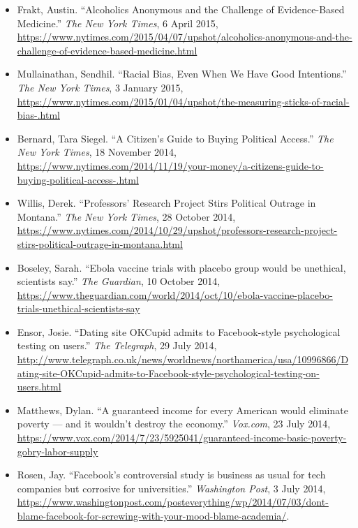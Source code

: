 \documentclass[12pt,a4paper]{article}
\begin{document}
\begin{itemize}
\item Frakt, Austin. ``Alcoholics Anonymous and the Challenge of Evidence-Based Medicine.'' \textit{The New York Times}, 6 April 2015, \url{https://www.nytimes.com/2015/04/07/upshot/alcoholics-anonymous-and-the-challenge-of-evidence-based-medicine.html}

\item Mullainathan, Sendhil. ``Racial Bias, Even When We Have Good Intentions.'' \textit{The New York Times}, 3 January 2015, \url{https://www.nytimes.com/2015/01/04/upshot/the-measuring-sticks-of-racial-bias-.html}

\item Bernard, Tara Siegel. ``A Citizen's Guide to Buying Political Access.'' \textit{The New York Times}, 18 November 2014, \url{https://www.nytimes.com/2014/11/19/your-money/a-citizens-guide-to-buying-political-access-.html}

\item Willis, Derek. ``Professors' Research Project Stirs Political Outrage in Montana.'' \textit{The New York Times}, 28 October 2014, \url{https://www.nytimes.com/2014/10/29/upshot/professors-research-project-stirs-political-outrage-in-montana.html}

\item Boseley, Sarah. ``Ebola vaccine trials with placebo group would be unethical, scientists say.'' \textit{The Guardian}, 10 October 2014, \url{https://www.theguardian.com/world/2014/oct/10/ebola-vaccine-placebo-trials-unethical-scientists-say}

\item Ensor, Josie. ``Dating site OKCupid admits to Facebook-style psychological testing on users.'' \textit{The Telegraph}, 29 July 2014,  \url{http://www.telegraph.co.uk/news/worldnews/northamerica/usa/10996866/Dating-site-OKCupid-admits-to-Facebook-style-psychological-testing-on-users.html}

\item Matthews, Dylan. ``A guaranteed income for every American would eliminate poverty — and it wouldn't destroy the economy.'' \textit{Vox.com}, 23 July 2014, \url{https://www.vox.com/2014/7/23/5925041/guaranteed-income-basic-poverty-gobry-labor-supply}

\item Rosen, Jay. ``Facebook's controversial study is business as usual for tech companies but corrosive for universities.'' \textit{Washington Post}, 3 July 2014, \url{https://www.washingtonpost.com/posteverything/wp/2014/07/03/dont-blame-facebook-for-screwing-with-your-mood-blame-academia/}.


\end{itemize}
\end{document}
